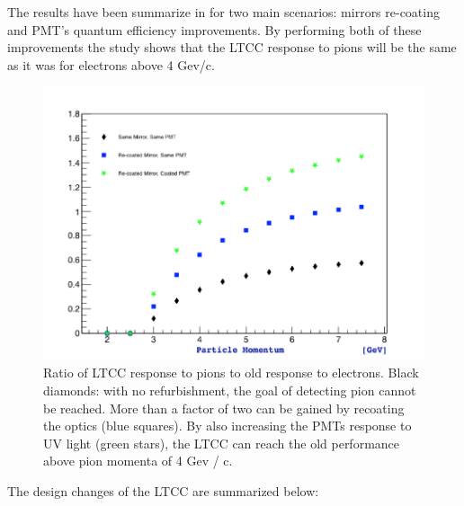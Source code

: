 The results have been summarize in  for two main scenarios: mirrors re-coating and PMT's quantum efficiency improvements.
By performing both of these improvements the study shows that the LTCC response to pions will be the same as it was for electrons above 4 Gev/c.

\begin{figure}
	\centering
	\includegraphics[width=0.95\columnwidth,keepaspectratio]{img/refurbishmentGains.png}
	\caption{Ratio of LTCC response to pions to old response to electrons. Black diamonds: with no refurbishment, the goal of detecting pion cannot be reached.
            More than a factor of two can be gained by recoating the optics (blue squares). By also increasing the PMTs response to UV light (green stars), the
            LTCC can reach the old performance above pion momenta of 4 Gev / c.}
	\label{fig:refurbishmentGains}
\end{figure}


The design changes of the LTCC are summarized below:

